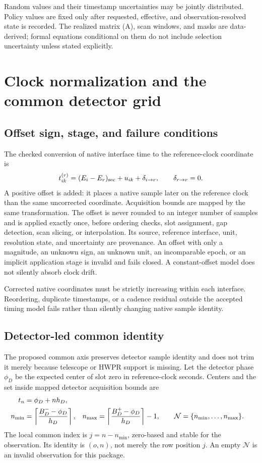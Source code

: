 \documentclass[11pt]{article}
\begin{document}
Random values and their timestamp uncertainties may be jointly distributed.
Policy values are fixed only after requested, effective, and
observation-resolved state is recorded.  The realized matrix (A), scan
windows, and masks are data-derived; formal equations conditional on them do
not include selection uncertainty unless stated explicitly.

\section{Clock normalization and the common detector grid}

\subsection{Offset sign, stage, and failure conditions}

The checked conversion of native interface time to the reference-clock
coordinate is
\begin{equation}
 t_{ik}^{(r)}=(E_i-E_r)_{\rm sec}+u_{ik}+\delta_{i\rightarrow r},
 \qquad \delta_{r\rightarrow r}=0.
 \label{eq:clock}
\end{equation}
A positive offset is added: it places a native sample later on the reference
clock than the same uncorrected coordinate.  Acquisition bounds are mapped by
the same transformation.  The offset is never rounded to an integer number
of samples and is applied exactly once, before ordering checks, slot
assignment, gap detection, scan slicing, or interpolation.  Its source,
reference interface, unit, resolution state, and uncertainty are provenance.
An offset with only a magnitude, an unknown sign, an unknown unit, an
incomparable epoch, or an implicit application stage is invalid and fails
closed.  A constant-offset model does not silently absorb clock drift.

Corrected native coordinates must be strictly increasing within each
interface.  Reordering, duplicate timestamps, or a cadence residual outside
the accepted timing model fails rather than silently changing native sample
identity.

\subsection{Detector-led common identity}

The proposed common axis preserves detector sample identity and does not trim
it merely because telescope or HWPR support is missing.  Let the detector
phase \(\phi_D\) be the expected center of slot zero in reference-clock
seconds.  Centers and the set inside mapped detector acquisition bounds are
\begin{align}
 t_n &= \phi_D+n h_D,\notag\\
 n_{\min} &= \left\lceil\frac{B_D^- -\phi_D}{h_D}\right\rceil,
 &n_{\max}&=\left\lceil\frac{B_D^+ -\phi_D}{h_D}\right\rceil-1,
 \qquad \mathcal N=\{n_{\min},\ldots,n_{\max}\}.
 \label{eq:grid}
\end{align}
The local common index is \(j=n-n_{\min}\), zero-based and stable for the
observation.  Its identity is \((o,n)\), not merely the row position \(j\).
An empty \(\mathcal N\) is an invalid observation for this package.
\end{document}
